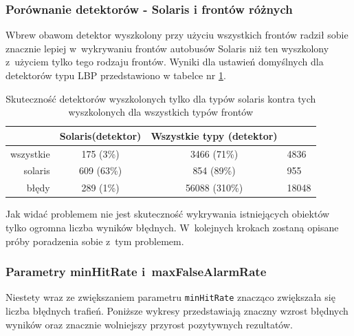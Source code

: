 \subsubsection{Porównanie detektorów - Solaris i frontów różnych}

Wbrew obawom detektor wyszkolony przy użyciu wszystkich frontów radził
sobie znacznie lepiej w~wykrywaniu frontów autobusów Solaris niż ten
wyszkolony z~użyciem tylko tego rodzaju frontów. Wyniki dla ustawień
domyślnych dla detektorów typu LBP przedstawiono w tabelce nr 
\ref{tab:sol_vs_all}.

\begin{table}[!h]
    \centering
    \begin{tabular}{r|c|c|l}
            & Solaris(detektor) & Wszystkie typy (detektor) &           \\
            \hline
wszystkie   & 175 (3\%)         & 3466 (71\%)               & 4836      \\
solaris     & 609 (63\%)        & 854 (89\%)                & 955       \\
błędy       & 289 (1\%)         & 56088 (310\%)             & 18048     \\
    \end{tabular}
    \caption{Skuteczność detektorów wyszkolonych tylko dla typów solaris kontra tych wyszkolonych dla wszystkich typów frontów}
    \label{tab:sol_vs_all}
\end{table}

Jak widać problemem nie jest skuteczność wykrywania istniejących obiektów
tylko ogromna liczba wyników błędnych. W~kolejnych krokach zostaną opisane
próby poradzenia sobie z~tym problemem.

\subsubsection{Parametry minHitRate i~maxFalseAlarmRate}

Niestety wraz ze zwiększaniem parametru \verb|minHitRate|
znacząco zwiększała
się liczba błędnych trafień. Poniższe wykresy przedstawiają znaczny wzrost
błędnych wyników oraz znacznie wolniejszy przyrost pozytywnych 
rezultatów.
\begin{center}
\end{center}

